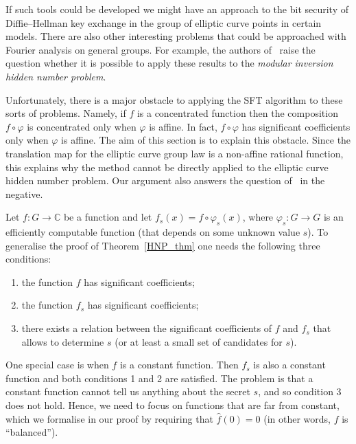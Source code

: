 \documentclass[11pt]{article}
\theoremstyle{definition}
\newcommand{\C}{\mathbb{C}}
\begin{document}
If such tools could be developed we might have an approach to the bit security of Diffie--Hellman key exchange in the group of elliptic curve points in certain models.
There are also other interesting problems that could be approached with Fourier analysis on general groups. For example, the authors of~\cite{MIHNP} raise the question whether it is possible to apply these results to the \emph{modular inversion hidden number problem}.

Unfortunately, there is a major obstacle to applying the SFT algorithm to these sorts of problems.
Namely, if $f$ is a concentrated function then the composition $f \circ \varphi$ is concentrated only when $\varphi$ is affine. In fact, $f \circ \varphi$ has significant coefficients only when $\varphi$ is affine.
The aim of this section is to explain this obstacle.
Since the translation map for the elliptic curve group law is a non-affine rational function, this explains why the method cannot be directly applied to the elliptic curve hidden number problem.
Our argument also answers the question of~\cite{MIHNP} in the negative.


\bigskip

Let $f : G \to \C$ be a function and let $f_s(x) = f \circ \varphi_s (x)$, where $\varphi_s : G \to G$ is an efficiently computable function (that depends on some unknown value $s$). To generalise the proof of Theorem~\ref{HNP_thm} one needs the following three conditions:

\begin{enumerate}
    \item the function $f$ has significant coefficients;
    \item the function $f_s$ has significant coefficients;
    \item there exists a relation between the significant coefficients of $f$ and $f_s$ that allows to determine $s$ (or at least a small set of candidates for $s$).
\end{enumerate}


One special case is when $f$ is a constant function. Then $f_s$ is also a constant function and both conditions 1 and 2 are satisfied. The problem is that a constant function cannot tell us anything about the secret $s$, and so condition 3 does not hold.
Hence, we need to focus on functions that are far from constant, which we formalise in our proof by requiring that $\widehat{f}(0) = 0$ (in other words, $f$ is ``balanced'').
\end{document}
